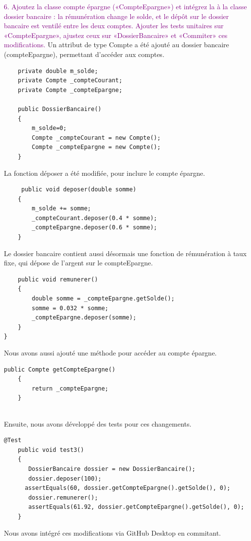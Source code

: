 \documentclass{article}
\begin{document}
\newline
\bigskip

\textcolor{Purple}{6. Ajoutez la classe compte épargne («CompteEpargne») et intégrez la à la classe dossier bancaire : la rémunération change le solde, et le dépôt sur le dossier bancaire est ventilé entre les deux comptes. Ajouter les tests unitaires sur «CompteEpargne», ajustez ceux sur «DossierBancaire» et «Commiter» ces modifications.}
\newline
Un attribut de type Compte a été ajouté au dossier bancaire (compteEpargne), permettant d'accéder aux comptes.
\begin{lstlisting}
    private double m_solde;
	private Compte _compteCourant;
	private Compte _compteEpargne;
	
    public DossierBancaire()
    {
    	m_solde=0;
    	Compte _compteCourant = new Compte();
    	Compte _compteEpargne = new Compte();
    }
\end{lstlisting}
La fonction déposer a été modifiée, pour inclure le compte épargne.
\begin{lstlisting}
     public void deposer(double somme)
    {
    	m_solde += somme;
    	_compteCourant.deposer(0.4 * somme);
    	_compteEpargne.deposer(0.6 * somme);
    }
\end{lstlisting}
Le dossier bancaire contient aussi désormais une fonction de rémunération à taux fixe, qui dépose de l'argent sur le compteEpargne.
\begin{lstlisting}
    public void remunerer()
    {
    	double somme = _compteEpargne.getSolde();
    	somme = 0.032 * somme;
    	_compteEpargne.deposer(somme);
    }
}
\end{lstlisting}
Nous avons aussi ajouté une méthode pour accéder au compte épargne.
\begin{lstlisting}
public Compte getCompteEpargne()
    {
    	return _compteEpargne;
    }
    
\end{lstlisting}

Ensuite, nous avons développé des tests pour ces changements.
\begin{lstlisting}
@Test  
	public void test3() 
	{
	   DossierBancaire dossier = new DossierBancaire();
	   dossier.deposer(100);
      assertEquals(60, dossier.getCompteEpargne().getSolde(), 0);	
	   dossier.remunerer();
	   assertEquals(61.92, dossier.getCompteEpargne().getSolde(), 0);	
	}
\end{lstlisting}

Nous avons intégré ces modifications via GitHub Desktop en commitant.
\bigskip
\end{document}
